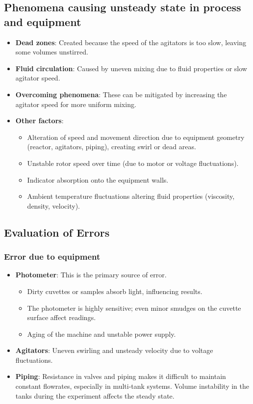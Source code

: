 \subsection{Phenomena causing unsteady state in process and equipment}
\begin{itemize}
    \item \textbf{Dead zones}: Created because the speed of the agitators is too slow, leaving some volumes unstirred.
    \item \textbf{Fluid circulation}: Caused by uneven mixing due to fluid properties or slow agitator speed.
    \item \textbf{Overcoming phenomena}: These can be mitigated by increasing the agitator speed for more uniform mixing.
    \item \textbf{Other factors}:
    \begin{itemize}
        \item Alteration of speed and movement direction due to equipment geometry (reactor, agitators, piping), creating swirl or dead areas.
        \item Unstable rotor speed over time (due to motor or voltage fluctuations).
        \item Indicator absorption onto the equipment walls.
        \item Ambient temperature fluctuations altering fluid properties (viscosity, density, velocity).
    \end{itemize}
\end{itemize}

\subsection{Evaluation of Errors}
\subsubsection{Error due to equipment}
\begin{itemize}
    \item \textbf{Photometer}: This is the primary source of error.
    \begin{itemize}
        \item Dirty cuvettes or samples absorb light, influencing results.
        \item The photometer is highly sensitive; even minor smudges on the cuvette surface affect readings.
        \item Aging of the machine and unstable power supply.
    \end{itemize}
    \item \textbf{Agitators}: Uneven swirling and unsteady velocity due to voltage fluctuations.
    \item \textbf{Piping}: Resistance in valves and piping makes it difficult to maintain constant flowrates, especially in multi-tank systems. Volume instability in the tanks during the experiment affects the steady state.
\end{itemize}

